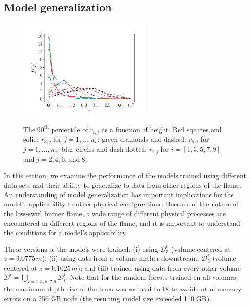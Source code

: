 \documentclass[review]{elsarticle}
\begin{document}
\subsection{Model generalization}\label{sec:predictions_all}

\begin{figure}[!tbp]%
  \centering%
  \includegraphics[page=4,width=0.6\textwidth]{./figs/pdf_distances.pdf}\\%
  \caption{The $90^{\text{th}}$ percentile of $r_{i,j}$ as a function
    of height. Red squares and solid: $r_{3,j}$ for $j=1,\dots,n_v$;
    green diamonds and dashed: $r_{5,j}$ for $j=1,\dots,n_v$; blue
    circles and dash-dotted: $r_{i,j}$ for $i=[1,3,5,7,9]$ and
    $j=2,4,6,\,\text{and}\ 8$.}\label{fig:r90}%
\end{figure}%

In this section, we examine the performance of the models trained
using different data sets and their ability to generalize to data from
other regions of the flame. An understanding of model generalization
has important implications for the model's applicability to other
physical configurations. Because of the nature of the low-swirl burner
flame, a wide range of different physical processes are encountered in
different regions of the flame, and it is important to understand the
conditions for a model's applicability.

Three versions of the models were trained: (i) using $\mathcal{D}_3^t$
(volume centered at $z=0.0775\,\unit{m}$); (ii) using data from a volume
farther downstream, $\mathcal{D}_5^t$ (volume centered at
$z=0.1025\,\unit{m}$); and (iii) trained using data from every other
volume
$\mathcal{D}^t = \bigcup\limits_{i=1, 3, 5, 7, 9} \mathcal{D}_i^t$.
Note that for the random forests trained on all volumes, the maximum depth size
of the trees was reduced to 18 to avoid out-of-memory errors
on a 256 GB node (the resulting model size exceeded 110 GB).
\end{document}

